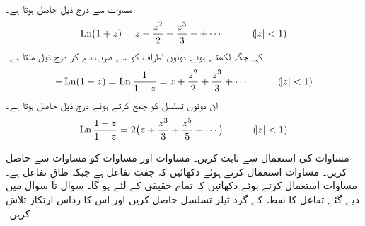 \quad {}\\
مساوات  سے درج ذیل حاصل ہوتا ہے۔
\begin{align}
\operatorname{Ln} (1+z)=z-\frac{z^2}{2}+\frac{z^3}{3}-+\cdots\quad \quad \quad (\abs{z}<1)
\end{align}
 کی جگہ  لکھتے ہوئے دونوں اطراف کو  سے ضرب دے کر درج ذیل ملتا ہے۔
\begin{align}
-\operatorname{Ln}(1-z)=\operatorname{Ln} \frac{1}{1-z}=z+\frac{z^2}{2}+\frac{z^3}{3}+\cdots \quad \quad \quad (\abs{z}<1)
\end{align}
ان دونوں تسلسل کو جمع کرتے ہوئے درج ذیل حاصل ہوتا ہے۔
\begin{align}
\operatorname{Ln} \frac{1+z}{1-z}=2\big(z+\frac{z^3}{3}+\frac{z^5}{5}+\cdots\big)\quad \quad \quad (\abs{z}<1)
\end{align}

\quad مساوات  کی استعمال سے  ثابت کریں۔
\quad مساوات  اور مساوات  کو مساوات  سے حاصل کریں۔
\quad
مساوات  استعمال کرتے ہوئے دکھائیں کہ  جفت تفاعل ہے جبکہ  طاق تفاعل ہے۔ 
\quad
مساوات  استعمال کرتے ہوئے دکھائیں کہ تمام حقیقی  کے لئے  ہو گا۔
سوال  تا سوال  میں دیے گئے تفاعل کا نقطہ  کے گرد ٹیلر تسلسل حاصل کریں اور اس کا رداس ارتکاز  تلاش کریں۔

